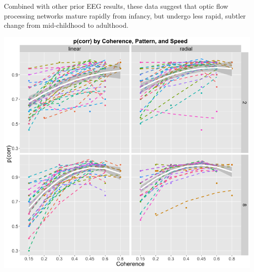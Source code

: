 \documentclass[landscape,final,a0paper,fontscale=0.285]{baposter}
\begin{document}
\begin{poster}
{%
      Combined with other prior EEG results, these data suggest that optic flow processing networks mature rapidly from infancy, but undergo less rapid, subtler change from mid-childhood to adulthood.

      \begin{center}
        \includegraphics[scale=0.3]{img/plot-pcor-2.png}
     

\end{center}}
\end{poster}
\end{document}
